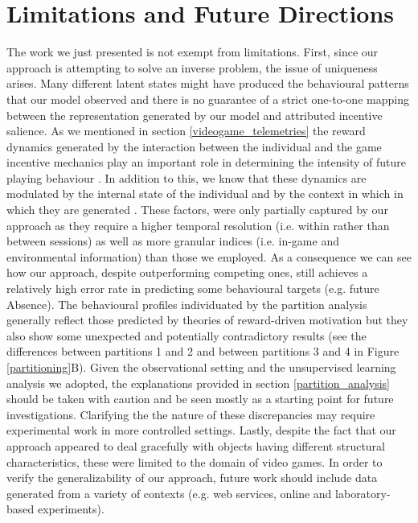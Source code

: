 \section{Limitations and Future Directions}
The work we just presented is not exempt from limitations. First, since our approach is attempting to solve an inverse problem, the issue of uniqueness arises. Many different latent states might have produced the behavioural patterns that our model observed and there is no guarantee of a strict one-to-one mapping between the representation generated by our model and attributed incentive salience.  As we mentioned in section \ref{videogame_telemetries} the reward dynamics generated by the interaction between the individual and the game incentive mechanics play an important role in determining the intensity of future playing behaviour \cite{agarwal2017quitting, avserivskis2017computational, wang2018beyond}. In addition to this, we know that these dynamics are modulated by the internal state of the individual \cite{zhang2009neural} and by the context in which in which they are generated \cite{palminteri2015contextual}. These factors, were only partially captured by our approach as they require a higher temporal resolution (i.e. within rather than between sessions) as well as more granular indices (i.e. in-game and environmental information) than those we employed. As a consequence we can see how our approach, despite outperforming competing ones, still achieves a relatively high error rate in predicting some behavioural targets (e.g. future Absence). The behavioural profiles individuated by the partition analysis generally reflect those predicted by theories of reward-driven motivation \cite{thorndike1927law,skinner1965science,berridge2004motivation} but they also show some unexpected and potentially contradictory results (see the differences between partitions 1 and 2 and between partitions 3 and 4 in Figure \ref{partitioning}B). Given the observational setting and the unsupervised learning analysis we adopted, the explanations provided in section \ref{partition_analysis} should be taken with caution and be seen mostly as a starting point for future investigations. Clarifying the the nature of these discrepancies may require experimental work in more controlled settings. Lastly, despite the fact that our approach appeared to deal gracefully  with objects having different structural characteristics, these were limited to the domain of video games. In order to verify the generalizability of our approach, future work should include data generated from a variety of contexts (e.g. web services, online and laboratory-based experiments).